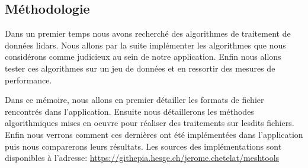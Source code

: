 \subsection*{Méthodologie}
Dans un premier temps nous avons recherché des algorithmes de
traitement de données lidars.
Nous allons par la suite implémenter les algorithmes que nous considérons comme judicieux au sein de notre application.
Enfin nous allons tester ces algorithmes sur un jeu de données et en ressortir des mesures
de performance.

Dans ce mémoire, nous allons en premier détailler les formats de fichier 
rencontrés dans l'application.
Ensuite nous détaillerons les méthodes algorithmiques mises en oeuvre pour
réaliser des traitements sur lesdits fichiers.
Enfin nous verrons comment ces dernières ont été implémentées dans
l'application puis nous comparerons leurs résultats.
Les sources des implémentations sont disponibles à l'adresse: \href{https://githepia.esge.ch/jerome.chetelat/meshtools}{https://githepia.hesge.ch/jerome.chetelat/meshtools}
